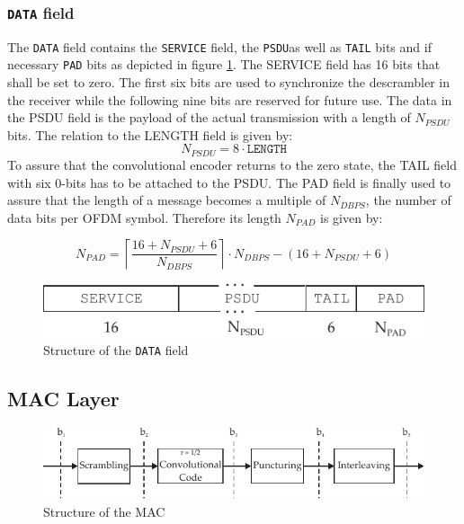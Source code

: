 \subsubsection{\texttt{DATA} field}

The \texttt{DATA} field contains the \texttt{SERVICE} field, the \texttt{\ac{PSDU}}as well as \texttt{TAIL} bits and if necessary \texttt{PAD} bits as depicted in figure \ref{fig:data_field}. The SERVICE field has 16 bits that shall be set to zero. The first six bits are used to synchronize the descrambler in the receiver while the following nine bits are reserved for future use. The data in the PSDU field is the payload of the actual transmission with a length of $N_{PSDU}$ bits. The relation to the LENGTH field is given by:
\begin{equation}
	N_{PSDU} = 8 \cdot \texttt{LENGTH}
\end{equation}
To assure that the convolutional encoder returns to the zero state, the TAIL field with six 0-bits has to be attached to the PSDU. The PAD field is finally used to assure that the length of a message becomes a multiple of $N_{DBPS}$, the number of data bits per \ac{OFDM} symbol. Therefore its length $N_{PAD}$ is given by:




\begin{equation}
N_{PAD} = \left\lceil \frac{16 + N_{PSDU} +6 }{N_{DBPS}} \right\rceil \cdot N_{DBPS} - \left ( 16 + N_{PSDU} + 6  \right )
\end{equation}

\begin{figure}[ht]
	\centering
		\includegraphics{../kapitel04/figures/Data_Field.pdf}
	\caption{Structure of the \texttt{DATA} field}
	\label{fig:data_field}
\end{figure}


\subsection{MAC Layer}

\begin{figure}[ht]
	\centering
		\includegraphics[width=1.00\textwidth]{../kapitel04/figures/MAC_IEEE.pdf}
	\caption{Structure of the MAC}
	\label{fig:MAC_IEEE}
\end{figure}


